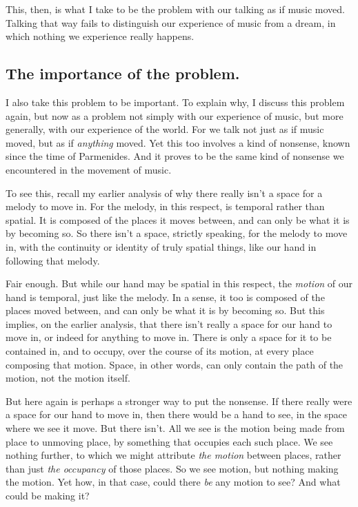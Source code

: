 \documentclass[12pt]{memoir}
\begin{document}
This, then, is what I take to be the problem with
our talking as if music moved. Talking that way
fails to distinguish our experience of music from
a dream, in which nothing we experience really
happens.

\subsection{The importance of the problem.}

I also take this problem to be important. To
explain why, I discuss this problem again, but
now as a problem not simply with our experience
of music, but more generally, with our experience
of the world. For we talk not just as if music
moved, but as if \emph{anything} moved. Yet this
too involves a kind of nonsense, known since the
time of Parmenides. And it proves to be the same
kind of nonsense we encountered in the movement of
music.

To see this, recall my earlier analysis of why
there really isn't a space for a melody to move
in. For the melody, in this respect, is temporal
rather than spatial. It is composed of the places
it moves between, and can only be what it is by
becoming so. So there isn't a space, strictly
speaking, for the melody to move in, with the
continuity or identity of truly spatial things,
like our hand in following that melody.

Fair enough. But while our hand may be spatial
in this respect, the \emph{motion} of our hand
is temporal, just like the melody. In a sense,
it too is composed of the places moved between,
and can only be what it is by becoming so. But
this implies, on the earlier analysis, that there
isn't really a space for our hand to move in, or
indeed for anything to move in. There is only a
space for it to be contained in, and to occupy,
over the course of its motion, at every place
composing that motion. Space, in other words,
can only contain the path of the motion, not the
motion itself.

But here again is perhaps a stronger way to put
the nonsense. If there really were a space for
our hand to move in, then there would be a hand
to see, in the space where we see it move. But
there isn't. All we see is the motion being
made from place to unmoving place, by something
that occupies each such place. We see nothing
further, to which we might attribute \emph{the
motion} between places, rather than just \emph{the
occupancy} of those places. So we see motion, but
nothing making the motion. Yet how, in that case,
could there \emph{be} any motion to see? And what
could be making it?
\end{document}
